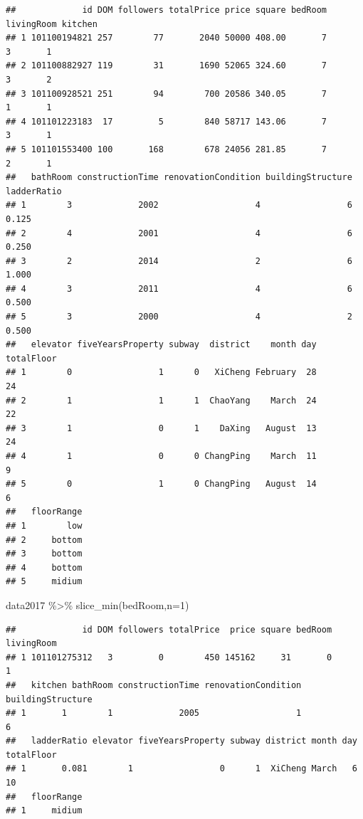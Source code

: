 \documentclass[
]{article}
\newenvironment{Shaded}{\begin{snugshade}}{\end{snugshade}}
\newcommand{\AttributeTok}[1]{\textcolor[rgb]{0.77,0.63,0.00}{#1}}
\newcommand{\DecValTok}[1]{\textcolor[rgb]{0.00,0.00,0.81}{#1}}
\newcommand{\FunctionTok}[1]{\textcolor[rgb]{0.00,0.00,0.00}{#1}}
\newcommand{\NormalTok}[1]{#1}
\newcommand{\SpecialCharTok}[1]{\textcolor[rgb]{0.00,0.00,0.00}{#1}}
\begin{document}
\begin{verbatim}
##             id DOM followers totalPrice price square bedRoom livingRoom kitchen
## 1 101100194821 257        77       2040 50000 408.00       7          3       1
## 2 101100882927 119        31       1690 52065 324.60       7          3       2
## 3 101100928521 251        94        700 20586 340.05       7          1       1
## 4 101101223183  17         5        840 58717 143.06       7          3       1
## 5 101101553400 100       168        678 24056 281.85       7          2       1
##   bathRoom constructionTime renovationCondition buildingStructure ladderRatio
## 1        3             2002                   4                 6       0.125
## 2        4             2001                   4                 6       0.250
## 3        2             2014                   2                 6       1.000
## 4        3             2011                   4                 6       0.500
## 5        3             2000                   4                 2       0.500
##   elevator fiveYearsProperty subway  district    month day totalFloor
## 1        0                 1      0   XiCheng February  28         24
## 2        1                 1      1  ChaoYang    March  24         22
## 3        1                 0      1    DaXing   August  13         24
## 4        1                 0      0 ChangPing    March  11          9
## 5        0                 1      0 ChangPing   August  14          6
##   floorRange
## 1        low
## 2     bottom
## 3     bottom
## 4     bottom
## 5     midium
\end{verbatim}

\begin{Shaded}
\begin{Highlighting}[]
\NormalTok{data2017 }\SpecialCharTok{\%\textgreater{}\%}
  \FunctionTok{slice\_min}\NormalTok{(bedRoom,}\AttributeTok{n=}\DecValTok{1}\NormalTok{)}
\end{Highlighting}
\end{Shaded}

\begin{verbatim}
##             id DOM followers totalPrice  price square bedRoom livingRoom
## 1 101101275312   3         0        450 145162     31       0          1
##   kitchen bathRoom constructionTime renovationCondition buildingStructure
## 1       1        1             2005                   1                 6
##   ladderRatio elevator fiveYearsProperty subway district month day totalFloor
## 1       0.081        1                 0      1  XiCheng March   6         10
##   floorRange
## 1     midium
\end{verbatim}
\end{document}
